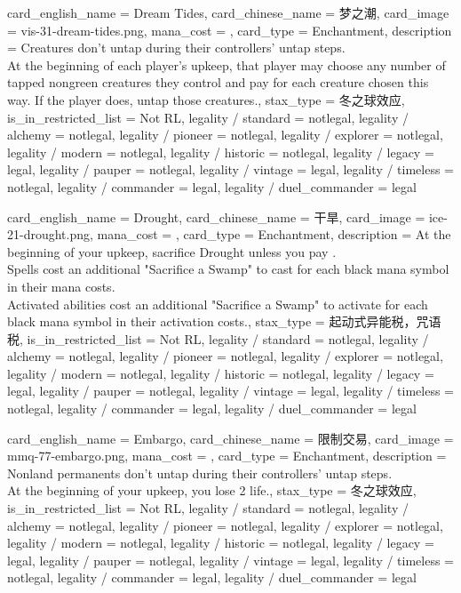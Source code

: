 \documentclass[lang = cn, color = black, 10pt]{AllThatStax}
\begin{document}
\card
{
	card_english_name = {Dream Tides},
	card_chinese_name = {梦之潮},
	card_image = vis-31-dream-tides.png,
	mana_cost = ,
	card_type = Enchantment,
	description = {Creatures don't untap during their controllers' untap steps.\\
		At the beginning of each player's upkeep, that player may choose any number of tapped nongreen creatures they control and pay  for each creature chosen this way. If the player does, untap those creatures.},
	stax_type = 冬之球效应,
	is_in_restricted_list = Not RL,
	legality / standard = notlegal,
	legality / alchemy = notlegal,
	legality / pioneer = notlegal,
	legality / explorer = notlegal,
	legality / modern = notlegal,
	legality / historic = notlegal,
	legality / legacy = legal,
	legality / pauper = notlegal,
	legality / vintage = legal,
	legality / timeless = notlegal,
	legality / commander = legal,
	legality / duel_commander = legal
}

\card
{
	card_english_name = {Drought},
	card_chinese_name = {干旱},
	card_image = ice-21-drought.png,
	mana_cost = ,
	card_type = Enchantment,
	description = {At the beginning of your upkeep, sacrifice Drought unless you pay .\\
		Spells cost an additional "Sacrifice a Swamp" to cast for each black mana symbol in their mana costs.\\
		Activated abilities cost an additional "Sacrifice a Swamp" to activate for each black mana symbol in their activation costs.},
	stax_type = 起动式异能税，咒语税,
	is_in_restricted_list = Not RL,
	legality / standard = notlegal,
	legality / alchemy = notlegal,
	legality / pioneer = notlegal,
	legality / explorer = notlegal,
	legality / modern = notlegal,
	legality / historic = notlegal,
	legality / legacy = legal,
	legality / pauper = notlegal,
	legality / vintage = legal,
	legality / timeless = notlegal,
	legality / commander = legal,
	legality / duel_commander = legal
}

\card
{
	card_english_name = {Embargo},
	card_chinese_name = {限制交易},
	card_image = mmq-77-embargo.png,
	mana_cost = ,
	card_type = Enchantment,
	description = {Nonland permanents don't untap during their controllers' untap steps.\\
		At the beginning of your upkeep, you lose 2 life.},
	stax_type = 冬之球效应,
	is_in_restricted_list = Not RL,
	legality / standard = notlegal,
	legality / alchemy = notlegal,
	legality / pioneer = notlegal,
	legality / explorer = notlegal,
	legality / modern = notlegal,
	legality / historic = notlegal,
	legality / legacy = legal,
	legality / pauper = notlegal,
	legality / vintage = legal,
	legality / timeless = notlegal,
	legality / commander = legal,
	legality / duel_commander = legal
}
\end{document}
